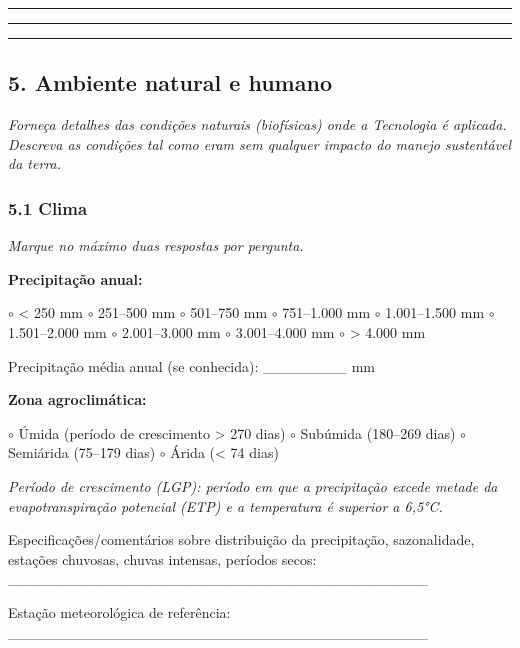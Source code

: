 \begin{center}\rule{0.5\linewidth}{0.5pt}\end{center}

\begin{center}\rule{0.5\linewidth}{0.5pt}\end{center}

\newpage

\begin{center}\rule{0.5\linewidth}{0.5pt}\end{center}

\subsection{5. Ambiente natural e humano}\label{ambiente-natural-e-humano}

\emph{Forneça detalhes das condições naturais (biofísicas) onde a Tecnologia é aplicada. Descreva as condições tal como eram sem qualquer impacto do manejo sustentável da terra.}

\subsubsection{5.1 Clima}\label{clima}

\emph{Marque no máximo duas respostas por pergunta.}

\textbf{Precipitação anual:}

$\circ$ \textless{} 250 mm $\circ$ 251--500 mm $\circ$ 501--750 mm $\circ$ 751--1.000 mm $\circ$ 1.001--1.500 mm $\circ$ 1.501--2.000 mm $\circ$ 2.001--3.000 mm $\circ$ 3.001--4.000 mm $\circ$ \textgreater{} 4.000 mm

Precipitação média anual (se conhecida): \_\_\_\_\_\_\_\_ mm

\textbf{Zona agroclimática:}

$\circ$ Úmida (período de crescimento \textgreater{} 270 dias) $\circ$ Subúmida (180--269 dias) $\circ$ Semiárida (75--179 dias) $\circ$ Árida (\textless{} 74 dias)

\emph{Período de crescimento (LGP): período em que a precipitação excede metade da evapotranspiração potencial (ETP) e a temperatura é superior a 6,5°C.}

Especificações/comentários sobre distribuição da precipitação, sazonalidade, estações chuvosas, chuvas intensas, períodos secos: \_\_\_\_\_\_\_\_\_\_\_\_\_\_\_\_\_\_\_\_\_\_\_\_\_\_\_\_\_\_\_\_\_\_\_\_\_\_\_\_

Estação meteorológica de referência: \_\_\_\_\_\_\_\_\_\_\_\_\_\_\_\_\_\_\_\_\_\_\_\_\_\_\_\_\_\_\_\_\_\_\_\_\_\_\_\_

